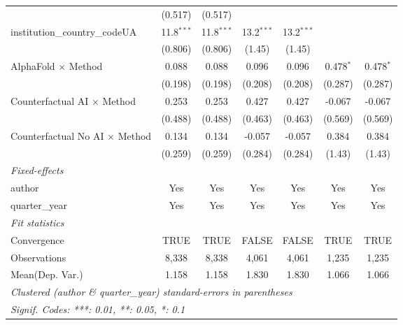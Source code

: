 \begin{tabular}{lcccccc}
                                         & (0.517)       & (0.517)       &               &               &               &   \\   
   institution\_country\_codeUA          & 11.8$^{***}$  & 11.8$^{***}$  & 13.2$^{***}$  & 13.2$^{***}$  &               &   \\   
                                         & (0.806)       & (0.806)       & (1.45)        & (1.45)        &               &   \\   
   AlphaFold $\times$ Method             & 0.088         & 0.088         & 0.096         & 0.096         & 0.478$^{*}$   & 0.478$^{*}$\\   
                                         & (0.198)       & (0.198)       & (0.208)       & (0.208)       & (0.287)       & (0.287)\\   
   Counterfactual AI $\times$ Method     & 0.253         & 0.253         & 0.427         & 0.427         & -0.067        & -0.067\\   
                                         & (0.488)       & (0.488)       & (0.463)       & (0.463)       & (0.569)       & (0.569)\\   
   Counterfactual No AI $\times$ Method  & 0.134         & 0.134         & -0.057        & -0.057        & 0.384         & 0.384\\   
                                         & (0.259)       & (0.259)       & (0.284)       & (0.284)       & (1.43)        & (1.43)\\   
   \midrule
   \emph{Fixed-effects}\\
   author                                & Yes           & Yes           & Yes           & Yes           & Yes           & Yes\\  
   quarter\_year                         & Yes           & Yes           & Yes           & Yes           & Yes           & Yes\\  
   \midrule
   \emph{Fit statistics}\\
   Convergence                           &TRUE           & TRUE          & FALSE         & FALSE         & TRUE          & TRUE\\  
   Observations                          & 8,338         & 8,338         & 4,061         & 4,061         & 1,235         & 1,235\\  
Mean(Dep. Var.) & 1.158 & 1.158 & 1.830 & 1.830 & 1.066 & 1.066 \\
   \midrule \midrule
   \multicolumn{7}{l}{\emph{Clustered (author \& quarter\_year) standard-errors in parentheses}}\\
   \multicolumn{7}{l}{\emph{Signif. Codes: ***: 0.01, **: 0.05, *: 0.1}}\\
\end{tabular}
\par\endgroup
